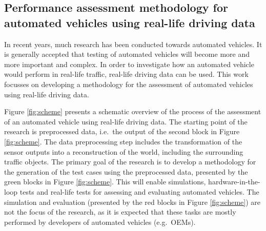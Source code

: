 \documentclass[10pt,final,a4paper,oneside,onecolumn]{article}
\begin{document}
\subsection*{Performance assessment methodology for automated vehicles using real-life driving data}

In recent years, much research has been conducted towards automated vehicles. It is generally accepted that testing of automated vehicles will become more and more important and complex. In order to investigate how an automated vehicle would perform in real-life traffic, real-life driving data can be used. This work focusses on developing a methodology for the assessment of automated vehicles using real-life driving data.

Figure \ref{fig:scheme} presents a schematic overview of the process of the assessment of an automated vehicle using real-life driving data. The starting point of the research is preprocessed data, i.e.\ the output of the second block in Figure \ref{fig:scheme}. The data preprocessing step includes the transformation of the sensor outputs into a reconstruction of the world, including the surrounding traffic objects. The primary goal of the research is to develop a methodology for the generation of the test cases using the preprocessed data, presented by the green blocks in Figure \ref{fig:scheme}. This will enable simulations, hardware-in-the-loop tests and real-life tests for assessing and evaluating automated vehicles. The simulation and evaluation (presented by the red blocks in Figure \ref{fig:scheme}) are not the focus of the research, as it is expected that these tasks are mostly performed by developers of automated vehicles (e.g.\ OEMs).
\end{document}
